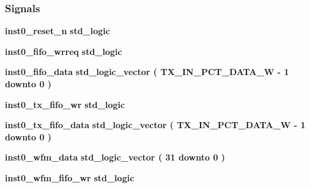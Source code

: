\subsubsection*{Signals}
 \begin{DoxyCompactItemize}
\item 
{\bf inst0\+\_\+reset\+\_\+n} {\bfseries \textcolor{comment}{std\+\_\+logic}\textcolor{vhdlchar}{ }} 
\item 
{\bf inst0\+\_\+fifo\+\_\+wrreq} {\bfseries \textcolor{comment}{std\+\_\+logic}\textcolor{vhdlchar}{ }} 
\item 
{\bf inst0\+\_\+fifo\+\_\+data} {\bfseries \textcolor{comment}{std\+\_\+logic\+\_\+vector}\textcolor{vhdlchar}{ }\textcolor{vhdlchar}{(}\textcolor{vhdlchar}{ }\textcolor{vhdlchar}{ }\textcolor{vhdlchar}{ }\textcolor{vhdlchar}{ }{\bfseries {\bf T\+X\+\_\+\+I\+N\+\_\+\+P\+C\+T\+\_\+\+D\+A\+T\+A\+\_\+W}} \textcolor{vhdlchar}{-\/}\textcolor{vhdlchar}{ } \textcolor{vhdldigit}{1} \textcolor{vhdlchar}{ }\textcolor{keywordflow}{downto}\textcolor{vhdlchar}{ }\textcolor{vhdlchar}{ } \textcolor{vhdldigit}{0} \textcolor{vhdlchar}{ }\textcolor{vhdlchar}{)}\textcolor{vhdlchar}{ }} 
\item 
{\bf inst0\+\_\+tx\+\_\+fifo\+\_\+wr} {\bfseries \textcolor{comment}{std\+\_\+logic}\textcolor{vhdlchar}{ }} 
\item 
{\bf inst0\+\_\+tx\+\_\+fifo\+\_\+data} {\bfseries \textcolor{comment}{std\+\_\+logic\+\_\+vector}\textcolor{vhdlchar}{ }\textcolor{vhdlchar}{(}\textcolor{vhdlchar}{ }\textcolor{vhdlchar}{ }\textcolor{vhdlchar}{ }\textcolor{vhdlchar}{ }{\bfseries {\bf T\+X\+\_\+\+I\+N\+\_\+\+P\+C\+T\+\_\+\+D\+A\+T\+A\+\_\+W}} \textcolor{vhdlchar}{-\/}\textcolor{vhdlchar}{ } \textcolor{vhdldigit}{1} \textcolor{vhdlchar}{ }\textcolor{keywordflow}{downto}\textcolor{vhdlchar}{ }\textcolor{vhdlchar}{ } \textcolor{vhdldigit}{0} \textcolor{vhdlchar}{ }\textcolor{vhdlchar}{)}\textcolor{vhdlchar}{ }} 
\item 
{\bf inst0\+\_\+wfm\+\_\+data} {\bfseries \textcolor{comment}{std\+\_\+logic\+\_\+vector}\textcolor{vhdlchar}{ }\textcolor{vhdlchar}{(}\textcolor{vhdlchar}{ }\textcolor{vhdlchar}{ } \textcolor{vhdldigit}{31} \textcolor{vhdlchar}{ }\textcolor{keywordflow}{downto}\textcolor{vhdlchar}{ }\textcolor{vhdlchar}{ } \textcolor{vhdldigit}{0} \textcolor{vhdlchar}{ }\textcolor{vhdlchar}{)}\textcolor{vhdlchar}{ }} 
\item 
{\bf inst0\+\_\+wfm\+\_\+fifo\+\_\+wr} {\bfseries \textcolor{comment}{std\+\_\+logic}\textcolor{vhdlchar}{ }} 
\item 

\end{DoxyCompactItemize}

